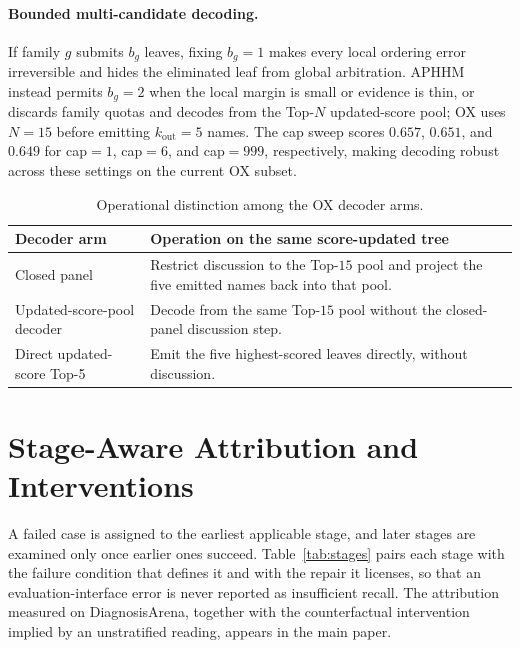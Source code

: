\documentclass[letterpaper]{article}
\begin{document}
\paragraph{Bounded multi-candidate decoding.}
If family $g$ submits $b_g$ leaves, fixing $b_g{=}1$ makes every local ordering error irreversible and hides the eliminated leaf from global arbitration.
APHHM instead permits $b_g{=}2$ when the local margin is small or evidence is thin, or discards family quotas and decodes from the Top-$N$ updated-score pool; OX uses $N{=}15$ before emitting $k_{\mathrm{out}}{=}5$ names.
The cap sweep scores $0.657$, $0.651$, and $0.649$ for cap${=}1$, cap${=}6$, and cap${=}999$, respectively, making decoding robust across these settings on the current OX subset.

\begin{table}[tb]
\centering
\small
\begin{tabular}{@{}p{2.15cm}p{4.45cm}@{}}
\toprule
Decoder arm & Operation on the same score-updated tree \\
\midrule
Closed panel & Restrict discussion to the Top-$15$ pool and project the five emitted names back into that pool. \\
Updated-score-pool decoder & Decode from the same Top-$15$ pool without the closed-panel discussion step. \\
Direct updated-score Top-5 & Emit the five highest-scored leaves directly, without discussion. \\
\bottomrule
\end{tabular}
\caption{Operational distinction among the OX decoder arms.}
\label{tab:decoder-contract}
\end{table}

\section{Stage-Aware Attribution and Interventions}

A failed case is assigned to the earliest applicable stage, and later stages are examined only once earlier ones succeed.
Table~\ref{tab:stages} pairs each stage with the failure condition that defines it and with the repair it licenses, so that an evaluation-interface error is never reported as insufficient recall.
The attribution measured on DiagnosisArena, together with the counterfactual intervention implied by an unstratified reading, appears in the main paper.
\end{document}
